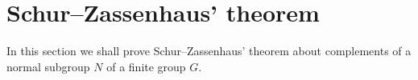 %
%
%
%
%
%
%

\section{Schur--Zassenhaus' theorem}

In this section we shall prove Schur--Zassenhaus' theorem 
about complements of a normal subgroup $N$ of a finite group $G$. 

